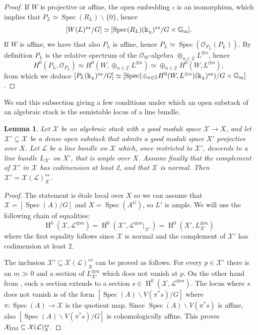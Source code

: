 \documentclass{amsart}
\newcommand{\bG}{\mathbb{G}}
\newcommand{\bZ}{\mathbb{Z}}
\newcommand{\oH}{\operatorname{H}}
\newcommand{\cL}{\mathcal{L}}
\newcommand{\cO}{\mathcal{O}}
\newcommand{\cX}{\mathcal{X}}
\newcommand{\spec}{\operatorname{Spec}}
\newcommand{\Gm}{\bG_{{\rm m}}}
\newcommand{\dm}{{\rm DM}}
\newtheorem{Lemma}[theorem]{Lemma}
\theoremstyle{definition}
\theoremstyle{definition}
\begin{document}
{\begin{proof}
    If $W$ is projective or affine, the open embedding $\iota$ is an isomorphism, which implies that $P_L\simeq \spec(R_L)\smallsetminus\{0\}$, hence
    \[ [W(L)^{ss}/G] \simeq [\spec(R_L)(\Bbbk_\chi)^{ss}/G\times\Gm].\]
    If $W$ is affine, we have that also $P_L$ is affine, hence $P_L\simeq \spec(\cO_{P_L}(P_L))$. By definition $P_L$ is the relative spectrum of the $\cO_W$-algebra $\oplus_{n\in \bZ} L^{\otimes n}$, hence
    \[ H^0(P_L,\cO_{P_L}) \simeq H^0(W, \oplus_{n\in \bZ} L^{\otimes n}) \simeq \oplus_{n\in \bZ} H^0(W,L^{\otimes n}),\]
    from which we deduce $[P_L(\Bbbk_\chi)^{ss}/G]\simeq [\spec(\oplus_{n\in \bZ} H^0(W,L^{\otimes n})(\Bbbk_\chi)^{ss})/G\times\Gm]$.
\end{proof}
We end this subsection giving a few conditions under which an open substack of an algebraic stack is the semistable locus of a line bundle.
\begin{Lemma}\label{lemma_condition_when_X_dm_is_the_ss_locus_for_a_vb_when_X_is_normal}
    Let $\cX$ be an algebraic stack with a good moduli space $\cX\to X$, and let $\cX'\subseteq \cX$ be a dense open substack that admits a good moduli space $X'$ projective over $X$. Let $\cL$ be a line bundle on $\cX$ which, once restricted to $\cX'$, descends to a line bundle $L_{X'}$ on $X'$, that is ample over $X$. Assume finally that the complement of $\cX'$ in $\cX$ has codimension at least 2, and that $\cX$ is normal. Then $\cX'=\cX(\cL)^{ss}_X$.
\end{Lemma}
\begin{proof}The statement is \'etale local over $X$ so we can assume that $\cX=[\spec(A)/G]$ and $X=\spec(A^G)$, so $L'$ is ample.
We will use the following chain of equalities: \begin{equation}\label{equality_sections}
    \oH^0(\cX,\cL^{\otimes m}) = \oH^0(\cX',\cL^{\otimes m}|_{\cX'}) = \oH^0(X',L_{X'}^{\otimes m})
\end{equation} where the first equality follows since $\cX$ is normal and the complement of $\cX'$ has codimension at least 2.

    The inclusion $\cX'\subseteq \cX(\cL)^{ss}_X$ can be proved as follows. For every $p\in \cX'$ there is an $m\gg 0$ and a section of $L_{X'}^{\otimes m}$ which does not vanish at $p$. On the other hand from , such a section extends to a section $s\in\oH^0(\cX,\cL^{\otimes m})$.
    The locus where $s$ does not vanish is of the form $[\spec(A)\smallsetminus V(\pi^*s)/G]$ where $\pi:\spec(A)\to \cX$ is the quotient map. Since $\spec(A)\smallsetminus V(\pi^*s)$ is affine, also $[\spec(A)\smallsetminus V(\pi^*s)/G]$ is cohomologically affine. This proves $\cX_\dm\subseteq \cX(\cL)^{ss}_X$.


\end{proof}}
\end{document}
